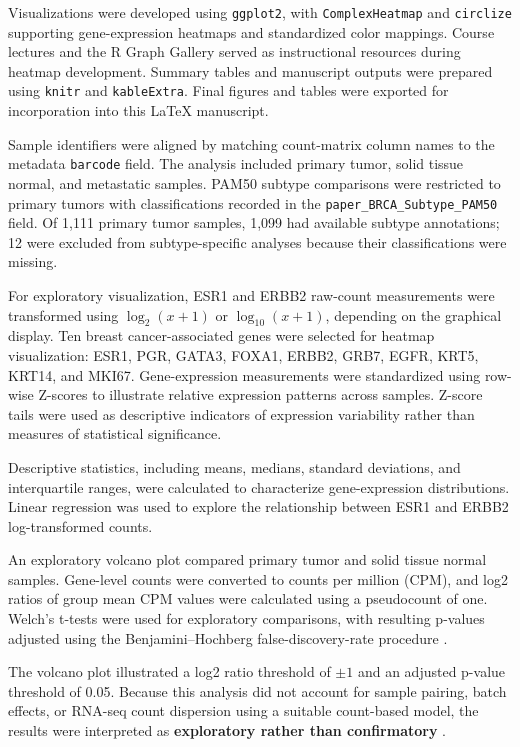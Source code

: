 \documentclass[12pt,letterpaper]{article}
\begin{document}
Visualizations were developed using \texttt{ggplot2}, with \texttt{ComplexHeatmap} and \texttt{circlize} supporting gene-expression heatmaps and standardized color mappings. Course lectures and the R Graph Gallery served as instructional resources during heatmap development. Summary tables and manuscript outputs were prepared using \texttt{knitr} and \texttt{kableExtra}. Final figures and tables were exported for incorporation into this LaTeX manuscript.

Sample identifiers were aligned by matching count-matrix column names to the metadata \texttt{barcode} field. The analysis included primary tumor, solid tissue normal, and metastatic samples. PAM50 subtype comparisons were restricted to primary tumors with classifications recorded in the \texttt{paper\_BRCA\_Subtype\_PAM50} field. Of 1,111 primary tumor samples, 1,099 had available subtype annotations; 12 were excluded from subtype-specific analyses because their classifications were missing.

For exploratory visualization, ESR1 and ERBB2 raw-count measurements were transformed using $\log_2(x+1)$ or $\log_{10}(x+1)$, depending on the graphical display. Ten breast cancer-associated genes were selected for heatmap visualization: ESR1, PGR, GATA3, FOXA1, ERBB2, GRB7, EGFR, KRT5, KRT14, and MKI67. Gene-expression measurements were standardized using row-wise Z-scores to illustrate relative expression patterns across samples. Z-score tails were used as descriptive indicators of expression variability rather than measures of statistical significance.

Descriptive statistics, including means, medians, standard deviations, and interquartile ranges, were calculated to characterize gene-expression distributions. Linear regression was used to explore the relationship between ESR1 and ERBB2 log-transformed counts.

An exploratory volcano plot compared primary tumor and solid tissue normal samples. Gene-level counts were converted to counts per million (CPM), and log2 ratios of group mean CPM values were calculated using a pseudocount of one. Welch's t-tests were used for exploratory comparisons, with resulting p-values adjusted using the Benjamini--Hochberg false-discovery-rate procedure \parencite{benjamini1995}.

The volcano plot illustrated a log2 ratio threshold of $\pm 1$ and an adjusted p-value threshold of 0.05. Because this analysis did not account for sample pairing, batch effects, or RNA-seq count dispersion using a suitable count-based model, the results were interpreted as \textbf{exploratory rather than confirmatory} \parencite{love2014}.
\end{document}
